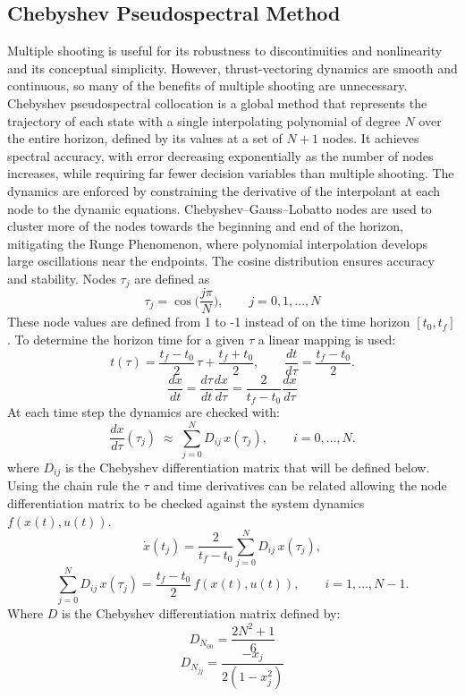 \documentclass[]{article}
\begin{document}
\subsection*{Chebyshev Pseudospectral Method}
Multiple shooting is useful for its robustness to discontinuities and nonlinearity and its conceptual simplicity. However, thrust-vectoring dynamics are smooth and continuous, so many of the benefits of multiple shooting are unnecessary. Chebyshev pseudospectral collocation \citep{chebyshevPS} is a global method that represents the trajectory of each state with a single interpolating polynomial of degree $N$ over the entire horizon, defined by its values at a set of $N+1$ nodes. It achieves spectral accuracy, with error decreasing exponentially as the number of nodes increases, while requiring far fewer decision variables than multiple shooting. The dynamics are enforced by constraining the derivative of the interpolant at each node to the dynamic equations. Chebyshev–Gauss–Lobatto nodes are used to cluster more of the nodes towards the beginning and end of the horizon, mitigating the Runge Phenomenon, where polynomial interpolation develops large oscillations near the endpoints. The cosine distribution ensures accuracy and stability. Nodes $\tau_j$ are defined as
	\[
        \tau_j = \cos{\Big(\frac{j\pi}{N}\Big)},\qquad j = 0,1,...,N
        \]
 These node values are defined from 1 to -1 instead of on the time horizon $[t_0 , t_f]$. To determine the horizon time for a given $\tau$ a linear mapping is used:
         \[
        t(\tau) = \frac{t_f-t_0}{2}\,\tau + \frac{t_f+t_0}{2}, 
        \qquad 
        \frac{dt}{d\tau} = \frac{t_f-t_0}{2}.
        \]
        \[
        \frac{dx}{dt}=\frac{d\tau}{dt}\frac{dx}{d\tau}=\frac{2}{t_f-t_0}\frac{dx}{d\tau}
        \]
At each time step the dynamics are checked with:
        \[
        \frac{dx}{d\tau}(\tau_j) \;\approx\; \sum_{j=0}^N D_{ij}\,x(\tau_j), 
        \qquad i=0,\dots,N.
        \]
where $D_{ij}$ is the Chebyshev differentiation matrix that will be defined below. Using the chain rule the $\tau$ and time derivatives can be related allowing the node differentiation matrix to be checked against the system dynamics $f(x(t), u(t))$.
        \[
       \dot{x}(t_j)= \frac{2}{t_f-t_0}\sum_{j=0}^N D_{ij}\,x(\tau_j), 
        \]
        \[
        \sum_{j=0}^N D_{ij}\,x(\tau_j)
        = \frac{t_f-t_0}{2}\, f(x(t),u(t)), 
        \qquad i=1,\dots,N-1.
        \]
Where $D$ is the Chebyshev differentiation matrix  defined by:
	\[
       D_{N_{00}}=\frac{2N^2+1}{6}
        \]
	\[
       D_{N_{jj}}=\frac{-x_j}{2(1-x_j^2)}
        \]
\end{document}
